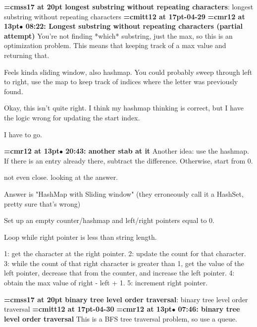 {\medskip\noindent\bf\font\titlefont=cmss17 at 20pt longest substring without repeating characters}: longest substring without repeating characters
{\medskip\noindent\bf\font\titlefont=cmitt12 at 17pt-04-29}\medskip
{\smallskip\noindent\bf\font\titlefont=cmr12 at 13pt\titlefont $\bullet$ 08:22: Longest substring without repeating characters (partial attempt)}\smallskip
You're not finding *which* substring, just the max, so this is an optimization problem. This means that keeping track of a max value and returning that.
\par

Feels kinda sliding window, also hashmap. You could probably sweep through left to right, use the map to keep track of indices where the letter was previously found.
\par

Okay, this isn't quite right. I think my hashmap thinking is correct, but I have the logic wrong for updating the start index.
\par

I have to go.
\par

{\smallskip\noindent\bf\font\titlefont=cmr12 at 13pt\titlefont $\bullet$ 20:43: another stab at it}\smallskip
Another idea: use the hashmap. If there is an entry already there, subtract the difference. Otherwise, start from 0.
\par

not even close. looking at the answer.
\par

Answer is "HashMap with Sliding window" (they erroneously call it a HashSet, pretty sure that's wrong)
\par

Set up an empty counter/hashmap and left/right pointers equal to 0.
\par

Loop while right pointer is less than string length.
\par

1: get the character at the right pointer. 2: update the count for that character. 3: while the count of that right character is greater than 1, get the value of the left pointer, decrease that from the counter, and increase the left pointer. 4: obtain the max value of right - left + 1. 5: increment right pointer.
\par

{\medskip\noindent\bf\font\titlefont=cmss17 at 20pt binary tree level order traversal}: binary tree level order traversal
{\medskip\noindent\bf\font\titlefont=cmitt12 at 17pt-04-30}\medskip
{\smallskip\noindent\bf\font\titlefont=cmr12 at 13pt\titlefont $\bullet$ 07:46: binary tree level order traversal}\smallskip
This is a BFS tree traversal problem, so use a queue.
\par


